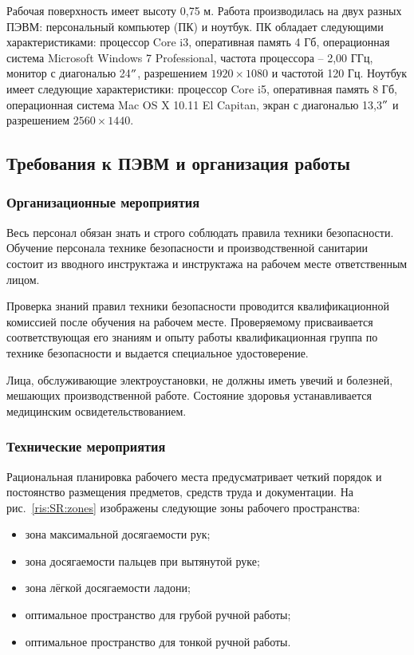 Рабочая поверхность имеет высоту 0,75 м.
Работа производилась на двух разных ПЭВМ: персональный компьютер (ПК) и ноутбук.
ПК обладает следующими характеристиками: процессор Core i3, оперативная память 4 Гб, операционная система Microsoft Windows 7 Professional, частота процессора – 2,00 ГГц, монитор с диагональю 24$"$, разрешением $1920 \times 1080$ и частотой 120 Гц.
Ноутбук имеет следующие характеристики: процессор Core i5, оперативная память 8 Гб, операционная система Mac OS X 10.11 El Capitan, экран с диагональю 13,3$"$ и разрешением $2560 \times 1440$.


\subsection{Требования к ПЭВМ и организация работы}

\subsubsection{Организационные мероприятия}

Весь персонал обязан знать и строго соблюдать правила техники безопасности. 
Обучение персонала технике безопасности и производственной санитарии состоит из вводного инструктажа и инструктажа на рабочем месте ответственным лицом.

Проверка знаний правил техники безопасности проводится квалификационной комиссией после обучения на рабочем месте.
Проверяемому присваивается соответствующая его знаниям и опыту работы квалификационная группа по технике безопасности и выдается специальное удостоверение.

Лица, обслуживающие электроустановки, не должны иметь увечий и болезней, мешающих производственной работе.
Состояние здоровья устанавливается медицинским освидетельствованием.

\subsubsection{Технические мероприятия}

Рациональная планировка рабочего места предусматривает четкий порядок и постоянство размещения предметов, средств труда и документации. 
На рис.~\ref{ris:SR:zones} изображены следующие зоны рабочего пространства:

\begin{itemize}
    \item зона максимальной досягаемости рук;
    \item зона досягаемости пальцев при вытянутой руке;
    \item зона лёгкой досягаемости ладони;
    \item оптимальное пространство для грубой ручной работы;
    \item оптимальное пространство для тонкой ручной работы.
\end{itemize}

